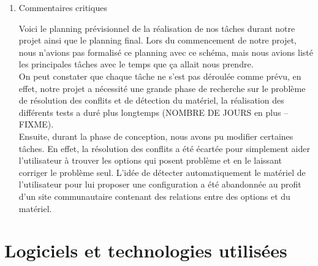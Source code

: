 \documentclass[16pts]{report}
\begin{document}
\begin{enumerate}
	\item Commentaires critiques

	Voici le planning prévisionnel de la réalisation de nos tâches durant 
	notre projet ainsi que le planning final. Lors du commencement de notre 
	projet, nous n'avions pas formalisé ce planning avec ce schéma, mais nous 
	avions listé les principales tâches avec le temps que ça allait 
	nous prendre.
	\\
	On peut constater que chaque tâche ne s'est pas déroulée comme prévu, 
	en effet, notre projet a nécessité une grande phase de recherche sur le 
	problème de résolution des conflits et de détection du matériel, la 
	réalisation des différents tests a duré plus longtemps 
	(NOMBRE DE JOURS en plus -- FIXME).
	\\
	Ensuite, durant la phase de conception, nous avons pu modifier 
	certaines tâches. En effet, la résolution des conflits a été écartée pour simplement aider l'utilisateur à trouver les options qui posent	problème et en le laissant corriger le problème seul. L'idée de détecter 
	automatiquement le matériel de l'utilisateur pour lui proposer une 
	configuration a été abandonnée au profit d'un site communautaire 
	contenant des relations entre des options et du matériel.



\end{enumerate}

\section{Logiciels et technologies utilisées}
\label{sec:Logiciels et technologies utilisés}
\end{document}
